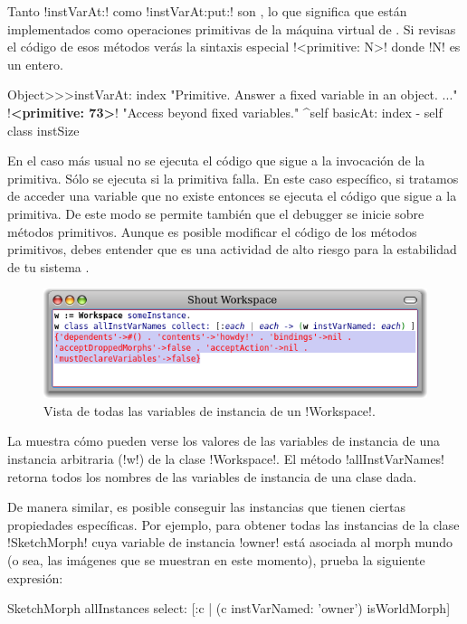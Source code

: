 \documentclass[a4paper,10pt,twoside]{book}
\begin{document}
Tanto \ct!instVarAt:! como \ct!instVarAt:put:! son , lo que significa que est\'an implementados como
operaciones primitivas de la m\'aquina virtual de \pharo.  Si revisas el
c\'odigo de esos m\'etodos ver\'as la sintaxis especial 
\ct!<primitive: N>! donde \ct!N! es un entero.

\begin{code}{}
Object>>>instVarAt: index
        "Primitive. Answer a fixed variable in an object. ..."
        !\textbf{<primitive: 73>}!
        "Access beyond fixed variables."
        ^self basicAt: index - self class instSize
\end{code}

En el caso m\'as usual no se ejecuta el c\'odigo que sigue a la invocaci\'on
de la primitiva.  S\'olo se ejecuta si la primitiva falla.  En este caso
espec\'ifico, si tratamos de acceder una variable que no existe entonces
se ejecuta el c\'odigo que sigue a la primitiva.  De este modo se
permite tambi\'en que el debugger se inicie sobre m\'etodos primitivos.
Aunque es posible modificar el c\'odigo de los m\'etodos primitivos, debes
entender que es una actividad de alto riesgo para la estabilidad de tu
sistema \pharo.

\begin{figure}[ht]\centering
        \includegraphics[width=\linewidth]{allInstanceVariables}
        \caption{Vista de todas las variables de instancia de un \ct!Workspace!.}
\end{figure}

La  muestra c\'omo pueden verse los valores
de las variables de instancia de una instancia arbitraria (\ct!w!) de
la clase \ct!Workspace!.  El m\'etodo \ct!allInstVarNames! retorna todos
los nombres de las variables de instancia de una clase dada.

De manera similar, es posible conseguir las instancias que tienen
ciertas propiedades espec\'ificas.  Por ejemplo, para obtener todas las
instancias de la clase \ct!SketchMorph! cuya variable de instancia
\ct!owner! est\'a asociada al morph mundo (o sea, las im\'agenes que se
muestran en este momento), prueba la siguiente expresi\'on:
\begin{code}{}
SketchMorph allInstances select: [:c | (c instVarNamed: 'owner') isWorldMorph]
\end{code}
\end{document}
